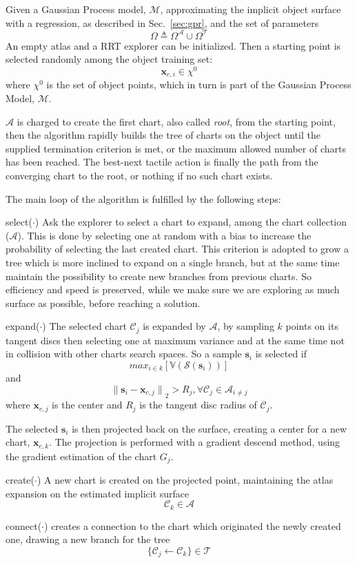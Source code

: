 Given a Gaussian Process model, $\mathcal{M}$, approximating the implicit object surface
with a regression, as described in Sec.~\ref{sec:gpr}, and the set of parameters
$$\Omega \triangleq \Omega^{\mathcal{A}} \cup \Omega^{\mathcal{T}}$$
An empty atlas and a RRT explorer can be initialized.
Then a starting point is selected randomly among the object training set:
$$
\mathbf{x}_{c,i} \in \chi^0
$$
where $\chi^0$ is the set of object points,
which in turn is part of the Gaussian Process Model, $\mathcal{M}$.

$\mathcal{A}$ is charged to create the first chart, also called \emph{root}, from the starting point,
then the algorithm rapidly builds the tree of charts on the object until the supplied termination
criterion is met, or the maximum allowed number of charts has been reached.
The best-next tactile action is finally the path from the converging chart to the root, or nothing if no such chart exists.

The main loop of the algorithm is fulfilled by the following steps:\\
\begin{inparadesc}
    \item[select($\cdot$)] Ask the explorer to select a chart to expand,
among the chart collection ($\mathcal{A}$).
This is done by selecting one at random with a bias to increase the probability
of selecting the last created chart. This criterion is adopted to grow a tree
which is more inclined to expand on a single branch, but at the same time maintain the
possibility to create new branches from previous charts. So efficiency and speed
is preserved, while we make sure we are exploring as much surface as possible,
before reaching a solution.\\
\item[expand($\cdot$)] The selected chart $\mathcal{C}_j$ is expanded by $\mathcal{A}$, by
sampling $k$ points on its tangent discs then selecting one at maximum variance
and at the same time not in collision with other charts search spaces. 
So a sample $\mathbf{s}_i$ is selected if 
$$
\mathit{max}_{i\in k}[\mathbb{V}(\mathcal{S}(\mathbf{s}_i))]
$$
and 
$$
{\parallel\mathbf{s}_i - \mathbf{x}_{c,j}\parallel}_{2} > R_j, \forall \mathcal{C}_j \in \mathcal{A}_{i \ne j}
$$
where $\mathbf{x}_{c,j}$ is the center and $R_j$ is the tangent disc radius of $\mathcal{C}_j$.

The selected $\mathbf{s}_i$ is then projected back on the surface,
creating a center for a new chart, $\mathbf{x}_{c,k}$.
The projection is performed with a gradient descend method, using the gradient estimation
of the chart $G_j$.\\
\item[create($\cdot$)] A new chart  is created on the projected point, maintaining the atlas
    expansion on the estimated implicit surface
$$
\mathcal{C}_k \in \mathcal{A}
$$
\item[connect($\cdot$)] creates a connection to the chart which originated the newly created one,
    drawing a new branch for the tree
$$
\{\mathcal{C}_j \leftarrow \mathcal{C}_k \} \in \mathcal{T}
$$
\end{inparadesc}

